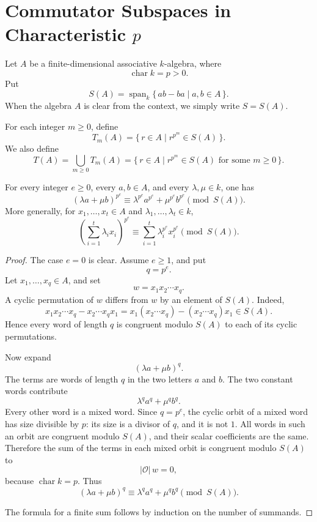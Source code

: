 \section{Commutator Subspaces in Characteristic \texorpdfstring{$p$}{p}}

Let \(A\) be a finite-dimensional associative \(k\)-algebra, where
\[
    \operatorname{char} k=p>0.
\]
Put
\[
    S(A)=\operatorname{span}_k\{\,ab-ba\mid a,b\in A\,\}.
\]
When the algebra \(A\) is clear from the context, we simply write \(S=S(A)\).

For each integer \(m\geq 0\), define
\[
    T_m(A)=\{\,r\in A\mid r^{p^m}\in S(A)\,\}.
\]
We also define
\[
    T(A)=\bigcup_{m\geq 0}T_m(A)
    =
    \{\,r\in A\mid r^{p^m}\in S(A)
    \text{ for some }m\geq 0\,\}.
\]

\begin{lemma}
    For every integer \(e\geq 0\), every \(a,b\in A\), and every
    \(\lambda,\mu\in k\), one has
    \[
        (\lambda a+\mu b)^{p^e}
        \equiv
        \lambda^{p^e}a^{p^e}+\mu^{p^e}b^{p^e}
        \pmod{S(A)}.
    \]
    More generally, for \(x_1,\ldots,x_t\in A\) and
    \(\lambda_1,\ldots,\lambda_t\in k\),
    \[
        \left(\sum_{i=1}^t\lambda_i x_i\right)^{p^e}
        \equiv
        \sum_{i=1}^t \lambda_i^{p^e}x_i^{p^e}
        \pmod{S(A)}.
    \]
\end{lemma}

\begin{proof}
    The case \(e=0\) is clear. Assume \(e\geq 1\), and put
    \[
        q=p^e.
    \]
    Let \(x_1,\ldots,x_q\in A\), and set
    \[
        w=x_1x_2\cdots x_q.
    \]
    A cyclic permutation of \(w\) differs from \(w\) by an element of \(S(A)\). Indeed,
    \[
        x_1x_2\cdots x_q-x_2\cdots x_qx_1
        =
        x_1(x_2\cdots x_q)-(x_2\cdots x_q)x_1
        \in S(A).
    \]
    Hence every word of length \(q\) is congruent modulo \(S(A)\) to each of its cyclic
    permutations.

    Now expand
    \[
        (\lambda a+\mu b)^q.
    \]
    The terms are words of length \(q\) in the two letters \(a\) and \(b\). The two
    constant words contribute
    \[
        \lambda^q a^q+\mu^q b^q.
    \]
    Every other word is a mixed word. Since \(q=p^e\), the cyclic orbit of a mixed word
    has size divisible by \(p\): its size is a divisor of \(q\), and it is not \(1\).
    All words in such an orbit are congruent modulo \(S(A)\), and their scalar
    coefficients are the same. Therefore the sum of the terms in each mixed orbit is
    congruent modulo \(S(A)\) to
    \[
        |\mathcal{O}|\,w=0,
    \]
    because \(\operatorname{char} k=p\). Thus
    \[
        (\lambda a+\mu b)^q
        \equiv
        \lambda^q a^q+\mu^q b^q
        \pmod{S(A)}.
    \]

    The formula for a finite sum follows by induction on the number of summands.
\end{proof}

